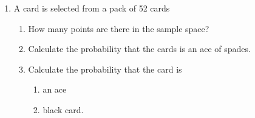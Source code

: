 \begin{enumerate}[label=\thechapter.\arabic*,ref=\thechapter.\theenumi]

\item A card is selected from a pack of 52 cards
\begin{enumerate}
\item How many points are there in the sample space?
\item Calculate the probability that the cards is an ace of spades.
\item Calculate the probability that the card is \begin{enumerate} \item an ace \item black card.
\end{enumerate}
\end{enumerate}
\end{enumerate}
